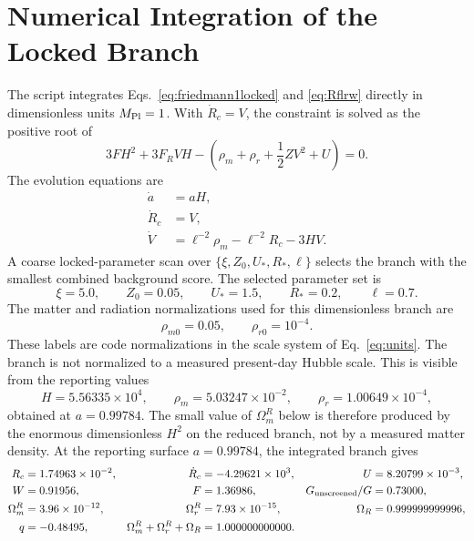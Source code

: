 \documentclass[12pt,a4paper]{article}
\DeclareRobustCommand{\codepath}[1]{\path{#1}}
\begin{document}
\section{Numerical Integration of the Locked Branch}

The script \codepath{code/locked_r_universe.py} integrates Eqs.~\eqref{eq:friedmann1locked} and \eqref{eq:Rflrw} directly in dimensionless units $M_{\rm Pl}=1$. With $\dot R_c=V$, the constraint is solved as the positive root of
\begin{equation}
3F H^2+3F_RVH-\left(\rho_m+\rho_r+\frac12ZV^2+U\right)=0.
\label{eq:Hroot}
\end{equation}
The evolution equations are
\begin{align}
\dot a&=aH,\\
\dot R_c&=V,\\
\dot V&=\ell^{-2}\rho_m-\ell^{-2}R_c-3HV.
\end{align}
A coarse locked-parameter scan over $\{\xi,Z_0,U_*,R_*,\ell\}$ selects the branch with the smallest combined background score. The selected parameter set is
\begin{equation}
\xi=5.0,
\qquad
Z_0=0.05,
\qquad
U_*=1.5,
\qquad
R_*=0.2,
\qquad
\ell=0.7.
\label{eq:locked-params}
\end{equation}
The matter and radiation normalizations used for this dimensionless branch are
\begin{equation}
\rho_{m0}=0.05,
\qquad
\rho_{r0}=10^{-4}.
\end{equation}
These labels are code normalizations in the scale system of Eq.~\eqref{eq:units}. The branch is not normalized to a measured present-day Hubble scale. This is visible from the reporting values
\begin{equation}
H=5.56335\times10^4,\qquad
\rho_m=5.03247\times10^{-2},\qquad
\rho_r=1.00649\times10^{-4},
\label{eq:reporting-rhos}
\end{equation}
obtained at $a=0.99784$. The small value of $\Omega_m^R$ below is therefore produced by the enormous dimensionless $H^2$ on the reduced branch, not by a measured matter density.
At the reporting surface $a=0.99784$, the integrated branch gives
\begin{align}
R_c&=1.74963\times10^{-2},&\dot R_c&=-4.29621\times10^3,&U&=8.20799\times10^{-3},\nonumber\\
W&=0.91956,&F&=1.36986,&G_{\rm unscreened}/G&=0.73000,\nonumber\\
\Omega_m^R&=3.96\times10^{-12},&\Omega_r^R&=7.93\times10^{-15},&\Omega_R&=0.999999999996,\nonumber\\
q&=-0.48495,&\Omega_m^R+\Omega_r^R+\Omega_R&=1.000000000000.
\label{eq:locked-result}
\end{align}
\end{document}
